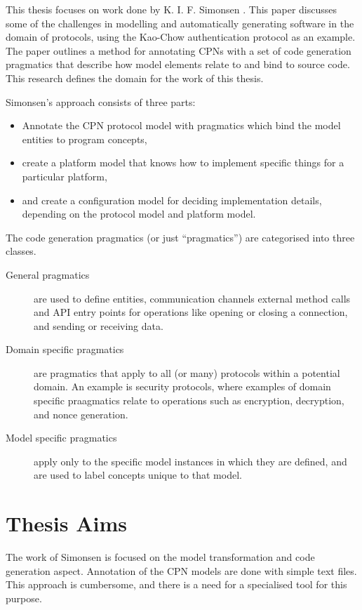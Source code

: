 This thesis focuses on work done by  K. I. F. Simonsen \cite{Simonsen2011}. This
paper discusses some of the challenges in modelling and automatically
generating software in the domain of protocols, using the Kao-Chow
authentication protocol as an example. The paper outlines a method for
annotating CPNs with a set of code generation pragmatics that describe how model
elements relate to and  bind to source code. This research defines the domain
for the work of this thesis.

Simonsen's approach consists of three parts: 
\begin{itemize}
	\item Annotate the CPN protocol model with
pragmatics which bind the model entities to program concepts,
	\item create a platform
model that knows how to implement specific things for a particular platform,
	\item and
create a configuration model for deciding implementation details, depending on
the protocol model and platform model.   
\end{itemize}   

The code generation pragmatics (or just ``pragmatics'') are categorised
into three classes.
\begin{description}
	\item[General pragmatics] are used to define entities, communication channels
	external method calls and API entry points for operations like opening or
	closing a connection, and sending or receiving data.
	\item[Domain specific pragmatics] are pragmatics that apply to all (or many)
	protocols within a potential domain. An example is security protocols, where
	examples of domain specific praagmatics relate to operations such as
	encryption, decryption, and nonce generation.
	\item[Model specific pragmatics] apply only to the specific model instances in
	which they are defined, and are used to label concepts unique to that model. 
\end{description}

\section{Thesis Aims}
The work of Simonsen is focused on the model transformation and code generation
aspect. Annotation of the CPN models are done with simple text files. This
approach is cumbersome, and there is a need for a specialised tool for this
purpose.

